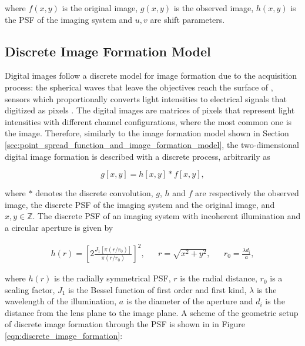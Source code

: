 \noindent where $f(x,y)$ is the original image, $g(x,y)$ is the observed image, $h(x,y)$ is the PSF of the imaging system and $u,v$ are shift parameters.

\subsection{Discrete Image Formation Model}

Digital images follow a discrete model for image formation due to the acquisition process: the spherical waves that leave the objectives reach the surface of , sensors which proportionally converts light intensities to electrical signals that digitized as pixels \cite{gonzalez2018digital}. The digital images are matrices of pixels that represent light intensities with different channel configurations, where the most common one is the  image. Therefore, similarly to the image formation model shown in Section \ref{sec:point_spread_function_and_image_formation_model}, the two-dimensional digital image formation is described with a discrete process, arbitrarily as

\begin{equation}
\label{eqn:discrete_image_formation}
g[x,y] = h[x,y] \ast f[x,y],
\end{equation}

\noindent where $\ast$ denotes the discrete convolution, $g$, $h$ and $f$ are respectively the observed image, the discrete PSF of the imaging system and the original image, and $x,y \in \mathbb{Z}$. The discrete PSF of an imaging system with incoherent illumination and a circular aperture is given by

\begin{align}
\label{eqn:discrete_psf}
h(r) = \left[
        2
        \frac{J_{1}[\pi (r / r_{0})]}{\pi (r / r_{0})}
       \right]^{2},
&&
r = \sqrt{x^{2} + y^{2}},
&&
r_{0} = \frac{\lambda d_{i}}{a},
\end{align}

\noindent where $h(r)$ is the radially symmetrical PSF, $r$ is the radial distance, $r_{0}$ is a scaling factor, $J_{1}$ is the Bessel function of first order and first kind, $\lambda$ is the wavelength of the illumination, $a$ is the diameter of the aperture and $d_{i}$ is the distance from the lens plane to the image plane. A scheme of the geometric setup of discrete image formation through the PSF is shown in in Figure \ref{eqn:discrete_image_formation}: 

